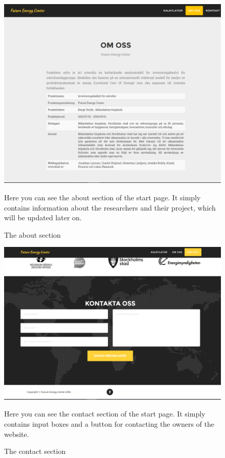 \documentclass[]{article}
\begin{document}
\begin{figure}[H]
	\includegraphics[width=1.0\linewidth]{pic4}
	\caption{The about section}
	\medskip
	\small
	Here you can see the about section of the start page. It simply contains information about the researchers and their project, which will be updated later on. 
	\label{fig:pic4}
\end{figure}
\begin{figure}[H]
	\includegraphics[width=1.0\linewidth]{pic5}
	\caption{The contact section}
	\medskip
	\small
	Here you can see the contact section of the start page. It simply contains input boxes and a button for contacting the owners of the website.
	\label{fig:pic5}
\end{figure}
\end{document}
